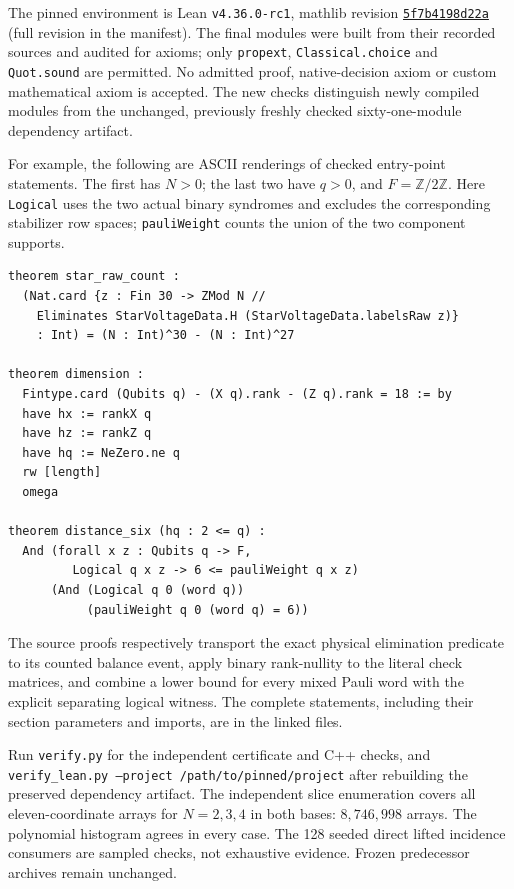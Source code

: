 \documentclass[11pt]{article}
\newcommand{\Z}{\mathbb Z}
\begin{document}
\noindent The pinned environment is Lean \texttt{v4.36.0-rc1}, mathlib revision
\href{https://github.com/leanprover-community/mathlib4/commit/5f7b4198d22a9c82e1c698a379334fe128095c82}{\texttt{5f7b4198d22a}} (full revision in the manifest). The final modules were
built from their recorded sources and audited for axioms; only \texttt{propext},
\texttt{Classical.choice} and \texttt{Quot.sound} are permitted. No admitted
proof, native-decision axiom or custom mathematical axiom is accepted.
The new checks distinguish newly compiled modules from the unchanged,
previously freshly checked sixty-one-module dependency artifact.

For example, the following are ASCII renderings of checked entry-point
statements. The first has $N>0$; the last two have $q>0$, and $F=\Z/2\Z$.
Here \texttt{Logical} uses the two actual binary syndromes and excludes the
corresponding stabilizer row spaces; \texttt{pauliWeight} counts the union of
the two component supports.
{\small\begin{verbatim}
theorem star_raw_count :
  (Nat.card {z : Fin 30 -> ZMod N //
    Eliminates StarVoltageData.H (StarVoltageData.labelsRaw z)}
    : Int) = (N : Int)^30 - (N : Int)^27

theorem dimension :
  Fintype.card (Qubits q) - (X q).rank - (Z q).rank = 18 := by
  have hx := rankX q
  have hz := rankZ q
  have hq := NeZero.ne q
  rw [length]
  omega

theorem distance_six (hq : 2 <= q) :
  And (forall x z : Qubits q -> F,
         Logical q x z -> 6 <= pauliWeight q x z)
      (And (Logical q 0 (word q))
           (pauliWeight q 0 (word q) = 6))
\end{verbatim}}
The source proofs respectively transport the exact physical elimination
predicate to its counted balance event, apply binary rank-nullity to the
literal check matrices, and combine a lower bound for every mixed Pauli word
with the explicit separating logical witness. The complete statements,
including their section parameters and imports, are in the linked files.


Run \texttt{verify.py} for the independent certificate and C++ checks, and
\texttt{verify\_lean.py --project /path/to/pinned/project} after rebuilding the
preserved dependency artifact. The independent slice enumeration covers all
eleven-coordinate arrays for $N=2,3,4$ in both bases: $8{,}746{,}998$ arrays.
The polynomial histogram agrees in every case. The 128 seeded direct lifted
incidence consumers are sampled checks, not exhaustive evidence. Frozen
predecessor archives remain unchanged.
\end{document}
